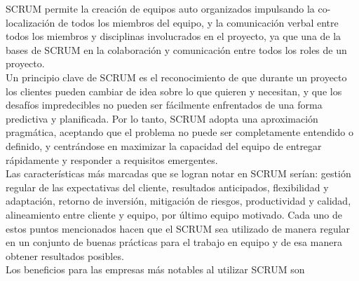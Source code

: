 \documentclass[../pfc.tex]{subfiles}
\begin{document}
	SCRUM permite la creación de equipos auto organizados impulsando la co-localización de todos los miembros del equipo, y la comunicación verbal entre todos los miembros y disciplinas involucrados en el proyecto, ya que una de la bases de SCRUM en la colaboración y comunicación entre todos los roles de un proyecto. \\
	
	Un principio clave de SCRUM es el reconocimiento de que durante un proyecto los clientes pueden cambiar de idea sobre lo que quieren y necesitan, y que los desafíos impredecibles no pueden ser fácilmente enfrentados de una forma predictiva y planificada. Por lo tanto, SCRUM adopta una aproximación pragmática, aceptando que el problema no puede ser completamente entendido o definido, y centrándose en maximizar la capacidad del equipo de entregar rápidamente y responder a requisitos emergentes.\\
	
	Las características más marcadas que se logran notar en SCRUM serían: gestión regular de las expectativas del cliente, resultados anticipados, flexibilidad y adaptación, retorno de inversión, mitigación de riesgos, productividad y calidad, alineamiento entre cliente y equipo, por último equipo motivado. Cada uno de estos puntos mencionados hacen que el SCRUM sea utilizado de manera regular en un conjunto de buenas prácticas para el trabajo en equipo y de esa manera obtener resultados posibles.\\
	
	Los beneficios para las empresas más notables al utilizar SCRUM son
	
\end{document}
